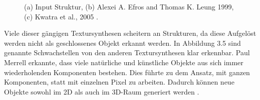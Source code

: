 \documentclass[12pt, a4paper,twoside,openright]{report} %
\begin{document}
\begin{figure}[H]
    \centering
    \qquad
    \qquad
    \caption{(a) Input Struktur, (b) Alexei A. Efros and Thomas K. Leung 1999, (c) Kwatra et al., 2005 \cite{merrell2009model}.}%
\end{figure}

Viele dieser gängigen Textursynthesen scheitern an Strukturen, da diese Aufgelöst werden nicht als geschlossenes Objekt erkannt werden.
In Abbildung 3.5 sind genannte Schwachstellen von den anderen Textursynthesen klar erkennbar.
\newline
Paul Merrell erkannte, dass viele natürliche und künstliche Objekte aus sich immer wiederholenden Komponenten bestehen.
Dies führte zu dem Ansatz, mit ganzen Komponenten, statt mit einzelnen Pixel zu arbeiten.
Dadurch können neue Objekte sowohl im 2D als auch im 3D-Raum generiert werden \cite{merrell2009model}.
\end{document}
